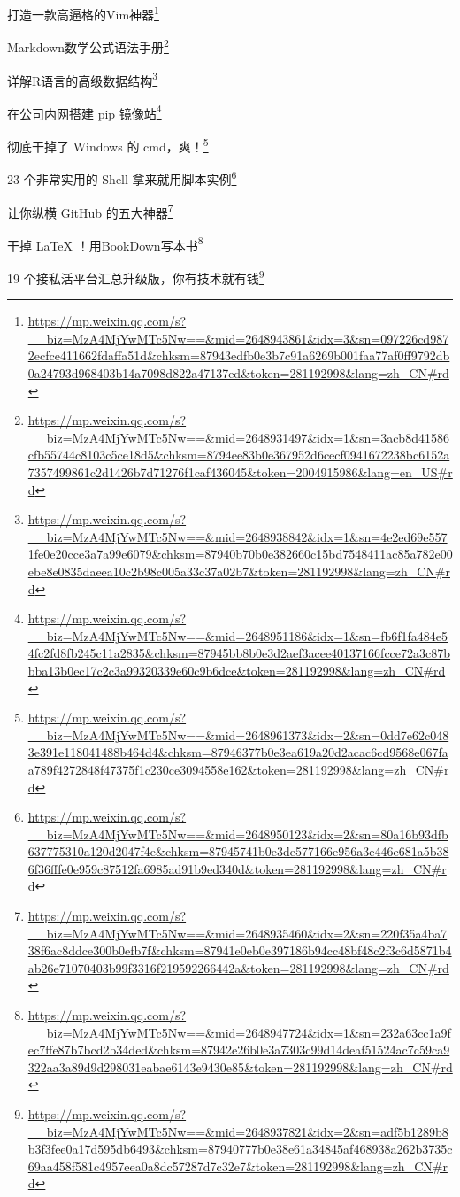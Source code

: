 \documentclass[]{ctexbook}
\renewcommand{\href}[2]{#2\footnote{\url{#1}}}
\begin{document}
\href{https://mp.weixin.qq.com/s?__biz=MzA4MjYwMTc5Nw==\&mid=2648943861\&idx=3\&sn=097226cd9872ecfce411662fdaffa51d\&chksm=87943edfb0e3b7c91a6269b001faa77af0ff9792db0a24793d968403b14a7098d822a47137ed\&token=281192998\&lang=zh_CN\#rd}{打造一款高逼格的Vim神器}

\href{https://mp.weixin.qq.com/s?__biz=MzA4MjYwMTc5Nw==\&mid=2648931497\&idx=1\&sn=3acb8d41586cfb55744c8103c5ce18d5\&chksm=8794ee83b0e367952d6cecf0941672238bc6152a7357499861c2d1426b7d71276f1caf436045\&token=2004915986\&lang=en_US\#rd}{Markdown数学公式语法手册}

\href{https://mp.weixin.qq.com/s?__biz=MzA4MjYwMTc5Nw==\&mid=2648938842\&idx=1\&sn=4e2ed69e5571fe0e20cce3a7a99e6079\&chksm=87940b70b0e382660c15bd7548411ac85a782e00ebe8e0835daeea10c2b98c005a33c37a02b7\&token=281192998\&lang=zh_CN\#rd}{详解R语言的高级数据结构}

\href{https://mp.weixin.qq.com/s?__biz=MzA4MjYwMTc5Nw==\&mid=2648951186\&idx=1\&sn=fb6f1fa484e54fc2fd8fb245c11a2835\&chksm=87945bb8b0e3d2aef3acee40137166fcce72a3c87bbba13b0ec17c2c3a99320339e60c9b6dce\&token=281192998\&lang=zh_CN\#rd}{在公司内网搭建 pip 镜像站}

\href{https://mp.weixin.qq.com/s?__biz=MzA4MjYwMTc5Nw==\&mid=2648961373\&idx=2\&sn=0dd7e62c0483e391e118041488b464d4\&chksm=87946377b0e3ea619a20d2acac6cd9568e067faa789f4272848f47375f1c230ce3094558e162\&token=281192998\&lang=zh_CN\#rd}{彻底干掉了 Windows 的 cmd，爽！}

\href{https://mp.weixin.qq.com/s?__biz=MzA4MjYwMTc5Nw==\&mid=2648950123\&idx=2\&sn=80a16b93dfb637775310a120d2047f4e\&chksm=87945741b0e3de577166e956a3e446e681a5b386f36fffe0e959c87512fa6985ad91b9ed340d\&token=281192998\&lang=zh_CN\#rd}{23 个非常实用的 Shell 拿来就用脚本实例}

\href{https://mp.weixin.qq.com/s?__biz=MzA4MjYwMTc5Nw==\&mid=2648935460\&idx=2\&sn=220f35a4ba738f6ac8ddce300b0efb7f\&chksm=87941e0eb0e397186b94cc48bf48c2f3c6d5871b4ab26e71070403b99f3316f219592266442a\&token=281192998\&lang=zh_CN\#rd}{让你纵横 GitHub 的五大神器}

\href{https://mp.weixin.qq.com/s?__biz=MzA4MjYwMTc5Nw==\&mid=2648947724\&idx=1\&sn=232a63cc1a9fec7ffe87b7bcd2b34ded\&chksm=87942e26b0e3a7303c99d14deaf51524ac7c59ca9322aa3a89d9d298031eabae6143e9430e85\&token=281192998\&lang=zh_CN\#rd}{干掉 LaTeX ！用BookDown写本书}

\href{https://mp.weixin.qq.com/s?__biz=MzA4MjYwMTc5Nw==\&mid=2648937821\&idx=2\&sn=adf5b1289b8b3f3fee0a17d595db6493\&chksm=87940777b0e38e61a34845af468938a262b3735c69aa458f581c4957eea0a8dc57287d7c32e7\&token=281192998\&lang=zh_CN\#rd}{19 个接私活平台汇总升级版，你有技术就有钱}
\end{document}
